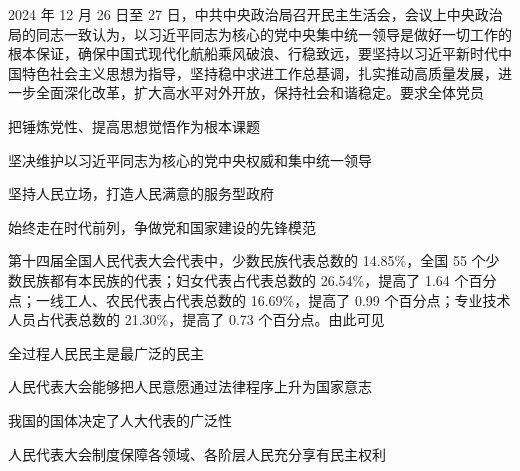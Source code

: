 \documentclass{exam-zh}
\begin{document}
\begin{question}
  2024 年 12 月 26 日至 27 日，中共中央政治局召开民主生活会，会议上中央政治局的同志一致认为，以习近平同志为核心的党中央集中统一领导是做好一切工作的根本保证，确保中国式现代化航船乘风破浪、行稳致远，要坚持以习近平新时代中国特色社会主义思想为指导，坚持稳中求进工作总基调，扎实推动高质量发展，进一步全面深化改革，扩大高水平对外开放，保持社会和谐稳定。要求全体党员

   把锤炼党性、提高思想觉悟作为根本课题

   坚决维护以习近平同志为核心的党中央权威和集中统一领导

   坚持人民立场，打造人民满意的服务型政府

   始终走在时代前列，争做党和国家建设的先锋模范

  \begin{choices}
  \item {}
  \item {}
  \item {}
  \item {}
  \end{choices}
\end{question}

\begin{question}
  第十四届全国人民代表大会代表中，少数民族代表总数的 14.85\%，全国 55 个少数民族都有本民族的代表；妇女代表占代表总数的 26.54\%，提高了 1.64 个百分点；一线工人、农民代表占代表总数的 16.69\%，提高了 0.99 个百分点；专业技术人员占代表总数的 21.30\%，提高了 0.73 个百分点。由此可见

   全过程人民民主是最广泛的民主

   人民代表大会能够把人民意愿通过法律程序上升为国家意志

   我国的国体决定了人大代表的广泛性

   人民代表大会制度保障各领域、各阶层人民充分享有民主权利

  \begin{choices}
  \item {}
  \item {}
  \item {}
  \item {}
  \end{choices}
\end{question}
\end{document}
